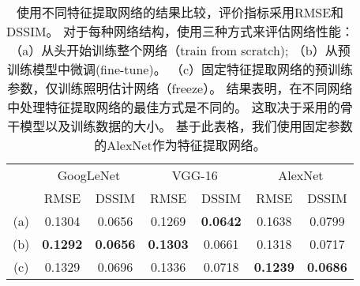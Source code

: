 \begin{table}[ht]
    \centering
    \caption[不同特征提取网络的对比]{
    \label{table:backbone}
    使用不同特征提取网络的结果比较，评价指标采用RMSE和DSSIM。 对于每种网络结构，使用三种方式来评估网络性能：（a）从头开始训练整个网络（train from scratch); （b）从预训练模型中微调(fine-tune)。 （c）固定特征提取网络的预训练参数，仅训练照明估计网络（freeze）。 结果表明，在不同网络中处理特征提取网络的最佳方式是不同的。 这取决于采用的骨干模型以及训练数据的大小。 基于此表格，我们使用固定参数的AlexNet作为特征提取网络。
    }
    \begin{tabular}{c|c|c|c|c|c|c} 
     \hline
    \multirow{2}{*}{}  & \multicolumn{2}{c|}{GoogLeNet} & \multicolumn{2}{c|}{VGG-16} & \multicolumn{2}{c}{AlexNet} \\ \cline{2-7}
    ~&RMSE&DSSIM&RMSE&DSSIM&RMSE&DSSIM\\
    \hline
    (a) & 0.1304 & 0.0656 & 0.1269 & \textbf{0.0642} & 0.1638 & 0.0799 \\
    (b) & \textbf{0.1292} & \textbf{0.0656} & \textbf{0.1303} & 0.0661 & 0.1318 & 0.0717 \\
    (c) & 0.1329 & 0.0696 & 0.1336 & 0.0718 & \textbf{0.1239} & \textbf{0.0686} \\
    \hline 
    \end{tabular}
\end{table}